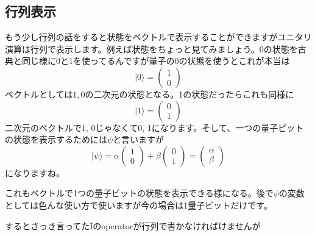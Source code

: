 \subsection{行列表示}
もう少し行列の話をすると状態をベクトルで表示することができますがユニタリ演算は行列で表示します。例えば状態をちょっと見てみましょう。0の状態を古典と同じ様に0と1を使ってるんですが量子の0の状態を使うとこれが本当は
\begin{equation}
|0\rangle=\left(\begin{array}{l}
1 \\
0
\end{array}\right)
\end{equation}
ベクトルとしては$1, 0$の二次元の状態となる。1の状態だったらこれも同様に
\begin{equation}
|1\rangle=\left(\begin{array}{l}
0 \\
1
\end{array}\right)
\end{equation}
二次元のベクトルで1, 0じゃなくて0, 1になります。そして、一つの量子ビットの状態を表示するためには$\psi$と言いますが
\begin{equation}
|\psi\rangle=\alpha\left(\begin{array}{l}
1 \\
0
\end{array}\right)+\beta\left(\begin{array}{l}
0 \\
1
\end{array}\right)=\left(\begin{array}{l}
\alpha \\
\beta
\end{array}\right)
\end{equation}になりますね。

これもベクトルで1つの量子ビットの状態を表示できる様になる。後で$\psi$の変数としては色んな使い方で使いますが今の場合は1量子ビットだけです。

するとさっき言ってたIのoperatorが行列で書かなければけませんが

